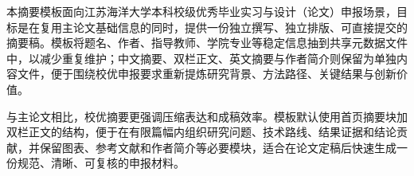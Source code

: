 本摘要模板面向江苏海洋大学本科校级优秀毕业实习与设计（论文）申报场景，目标是在复用主论文基础信息的同时，提供一份独立撰写、独立排版、可直接提交的摘要稿。模板将题名、作者、指导教师、学院专业等稳定信息抽到共享元数据文件中，以减少重复维护；中文摘要、双栏正文、英文摘要与作者简介则保留为单独内容文件，便于围绕校优申报要求重新提炼研究背景、方法路径、关键结果与创新价值。

与主论文相比，校优摘要更强调压缩表达和成稿效率。模板默认使用首页摘要块加双栏正文的结构，便于在有限篇幅内组织研究问题、技术路线、结果证据和结论贡献，并保留图表、参考文献和作者简介等必要模块，适合在论文定稿后快速生成一份规范、清晰、可复核的申报材料。
